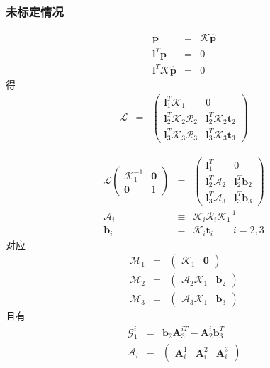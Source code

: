 \documentclass{beamer}
\newcommand{\nospace}{}
\newcommand{\tmmathbf}[1]{\ensuremath{\boldsymbol{#1}}}
\begin{document}
{{\begin{frame}
\end{frame}}{\begin{frame}
  \frametitle{未标定情况}
  \begin{eqnarray*}
    \tmmathbf{p} & = & \mathcal{K} \hat{\tmmathbf{p}}\\
    \tmmathbf{l}^T \tmmathbf{p} & = & 0\\
    \tmmathbf{l}^T \mathcal{K} \hat{\tmmathbf{p}} & = & 0
  \end{eqnarray*}
  得
  \begin{eqnarray*}
    \mathcal{L} & = & \left(\begin{array}{cc}
      \tmmathbf{l}_1^T \mathcal{K}_1 & 0\\
      \tmmathbf{l}_2^T \mathcal{K}_2 \mathcal{R}_2 & \tmmathbf{l}_2^T
      \mathcal{K}_2 \tmmathbf{t}_2\\
      \tmmathbf{l}_3^T \mathcal{K}_3 \mathcal{R}_3 & \tmmathbf{l}_3^T
      \mathcal{K}_3 \tmmathbf{t}_3
    \end{array}\right)
  \end{eqnarray*}
\end{frame}}{\begin{eqnarray*}
  \mathcal{L} \left(\begin{array}{cc}
    \mathcal{K}_1^{- 1} & \tmmathbf{0}\\
    \tmmathbf{0} & 1
  \end{array}\right) & = & \left(\begin{array}{cc}
    \tmmathbf{l}_1^T & 0\\
    \tmmathbf{l}_2^T \mathcal{A}_2 & \tmmathbf{l}_2^T \tmmathbf{b}_2\\
    \tmmathbf{l}_3^T \mathcal{A}_3 & \tmmathbf{l}_3^T \tmmathbf{b}_3
  \end{array}\right)\\
  \mathcal{A}_i & \equiv & \mathcal{K}_i \mathcal{R}_i \mathcal{K}_1^{- 1}\\
  \tmmathbf{b}_i & = & \mathcal{K}_i \tmmathbf{t}_i \qquad i = 2, 3
\end{eqnarray*}
对应
\begin{eqnarray*}
  \mathcal{M}_1 & = & \left(\begin{array}{cc}
    \mathcal{K}_1 & \tmmathbf{0}
  \end{array}\right)\\
  \mathcal{M}_2 & = & \left(\begin{array}{cc}
    \mathcal{A}_2 \mathcal{K}_1 & \tmmathbf{b}_2
  \end{array}\right)\\
  \mathcal{M}_3 & = & \left(\begin{array}{cc}
    \mathcal{A}_3 \mathcal{K}_1 & \tmmathbf{b}_3
  \end{array}\right)
\end{eqnarray*}
且有
\begin{eqnarray*}
  \mathcal{G}_1^i & = & \tmmathbf{b}_2 \tmmathbf{A}_3^{i \nospace T}
  -\tmmathbf{A}_2^i \tmmathbf{b}_3^T\\
  \mathcal{A}_i & = & \left(\begin{array}{ccc}
    \tmmathbf{A}^1_i & \tmmathbf{A}_i^2 & \tmmathbf{A}_i^3
  \end{array}\right)
\end{eqnarray*}}}
\end{document}
